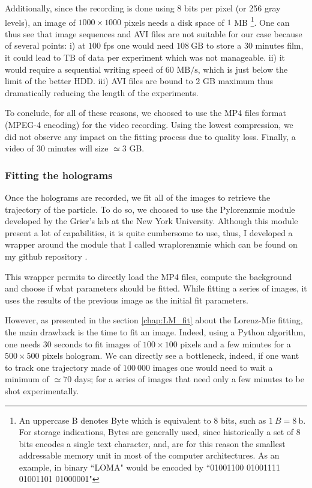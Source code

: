 \newpage

Additionally, since the recording is done using 8 bits per pixel (or 256 gray levels), an image of $1000 \times 1000$ pixels needs a disk space of $1$ MB \footnote{An uppercase B denotes Byte which is equivalent to 8 bits, such as $1\mathrm ~ {B} = 8 ~ \mathrm{b}$. For storage indications, Bytes are generally used, since historically a set of $8$ bits encodes a single text character, and, are for this reason the smallest addressable memory unit in most of the computer architectures. As an example, in binary ``LOMA" would be encoded by ``01001100 01001111 01001101 01000001" }. One can thus see that image sequences and AVI files are not suitable for our case because of several points: i) at $100$ \gls{fps} one would need $108 ~ \mathrm{GB}$ to store a 30 minutes film, it could lead to TB of data per experiment which was not manageable. ii) it would require a sequential writing speed of 60 $\mathrm{MB/s}$, which is just below the limit of the better HDD. iii) AVI files are bound to 2 GB maximum thus dramatically reducing the length of the experiments.

To conclude, for all of these reasons, we choosed to use the MP4 files format (MPEG-4 encoding) for the video recording. Using the lowest compression, we did not observe any impact on the fitting process due to quality loss. Finally, a video of 30 minutes will size $\simeq 3$ GB.


\subsubsection{Fitting the holograms}


Once the holograms are recorded, we fit all of the images to retrieve the trajectory of the particle. To do so, we choosed to use the Pylorenzmie module developed by the Grier's lab at the New York University. Although this module present a lot of capabilities, it is quite cumbersome to use, thus, I developed a wrapper around the module that I called wraplorenzmie which can be found on my github repository \href{https://github.com/eXpensia/wraplorenzmie}{\faGithub}. 

This wrapper permits to directly load the MP4 files, compute the background and choose if what parameters should be fitted. While fitting a series of images, it uses the results of the previous image as the initial fit parameters.

However, as presented in the section \ref{chap:LM_fit} about the Lorenz-Mie fitting, the main drawback is the time to fit an image. Indeed, using a Python algorithm, one needs $30$ seconds to fit images of $100 \times  100$ pixels and a few minutes for a $500\times 500$ pixels hologram. We can directly see a bottleneck, indeed, if one want to track one trajectory made of $100~000$ images one would need to wait a minimum of $\simeq 70$ days; for a series of images that need only a few minutes to be shot experimentally. 

